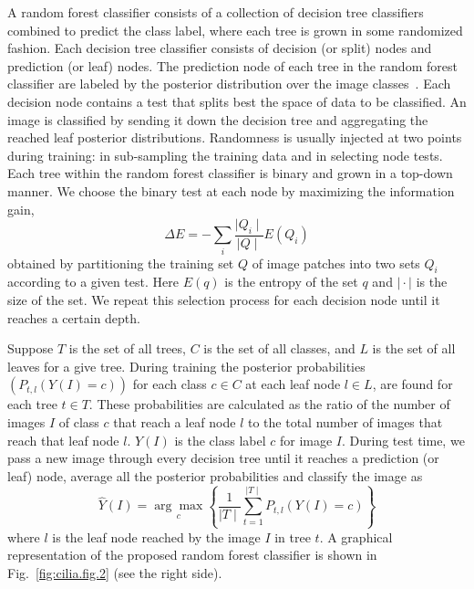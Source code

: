 A random forest classifier consists of a collection of decision tree classifiers combined to predict the class label, where each tree is grown in some randomized fashion. Each decision tree classifier consists of decision (or split) nodes and prediction (or leaf) nodes. The prediction node of each tree in the random forest classifier are labeled by the posterior distribution over the image classes~\cite{bosch_Image_2007}. Each decision node contains a test that splits best the space of data to be classified. An image is classified by sending it down the decision tree and aggregating the reached leaf posterior distributions. Randomness is usually injected at two points during training: in sub-sampling the training data and in selecting node tests. Each tree within the random forest classifier is binary and grown in a top-down manner. We choose the binary test at each node by maximizing the information gain,
\begin{equation}
\Delta E = -\sum_{i}\frac{\mid Q_{i}\mid}{\mid Q\mid}E(Q_{i})
\label{eq:cilia.eq.2}
\end{equation}
obtained by partitioning the training set $Q$ of image patches into two sets $Q_{i}$ according to a given test. Here $E(q)$ is the entropy of the set $q$ and $\mid \cdot\mid$ is the size of the set. We repeat this selection process for each decision node until it reaches a certain depth.

Suppose $T$ is the set of all trees, $C$ is the set of all classes, and $L$ is the set of all leaves for a give tree. During training the posterior probabilities $\left(P_{t,l}(Y(I) = c)\right)$ for each class $c \in C$ at each leaf node $l \in L$, are found for each tree $t \in T$. These probabilities are calculated as the ratio of the number of images $I$ of class $c$ that reach a leaf node $l$ to the total number of images that reach that leaf node $l$. $Y(I)$ is the class label $c$ for image $I$. During test time, we pass a new image through every decision tree until it reaches a prediction (or leaf) node, average all the posterior probabilities and classify the image as
\begin{equation}
\hat{Y}(I) = \underset{c}{\arg \max}\left\{\frac{1}{\mid T\mid}\sum_{t=1}^{\mid T\mid} P_{t,l}(Y(I) = c)\right\}
\label{eq:cilia.eq.3}
\end{equation}
where $l$ is the leaf node reached by the image $I$ in tree $t$. A graphical representation of the proposed random forest classifier is shown in Fig.~\ref{fig:cilia.fig.2} (see the right side).

